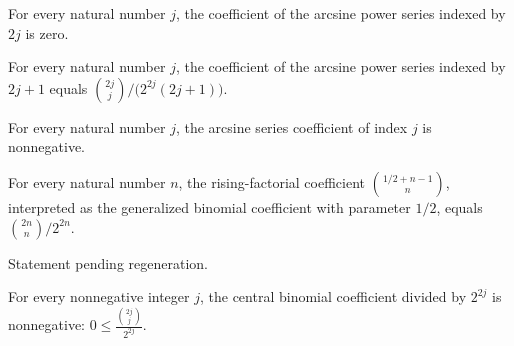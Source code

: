 \begin{lemma}
\label{FABL.arcsinOddPowerCoefficient_mul_two}
\leanok
{}
For every natural number $j$, the coefficient of the arcsine power series indexed by
$2j$ is zero.
\end{lemma}

\begin{lemma}
\label{FABL.arcsinOddPowerCoefficient_mul_two_add_one}
\leanok
{}
For every natural number $j$, the coefficient of the arcsine power series indexed by
$2j+1$ equals $\binom{2j}{j}/\bigl(2^{2j}(2j+1)\bigr)$.
\end{lemma}

\begin{lemma}
\label{FABL.arcsinSeriesCoefficient_nonneg}
\leanok
{}
For every natural number $j$, the arcsine series coefficient of index $j$ is
nonnegative.
\end{lemma}

\begin{lemma}
\label{FABL.multichoose_one_half_eq_centralBinom}
\leanok
{}
For every natural number $n$, the rising-factorial coefficient $\binom{1/2+n-1}{n}$,
interpreted as the generalized binomial coefficient with parameter $1/2$, equals
$\binom{2n}{n}/2^{2n}$.
\end{lemma}

\begin{theorem}[Exercise5 18a]
\label{FABL.exercise5_18a}
\leanok
{}
Statement pending regeneration.
\end{theorem}

\begin{lemma}
\label{FABL.centralBinomialRatio_nonneg}
\leanok
{}
For every nonnegative integer $j$, the central binomial coefficient divided by $2^{2j}$
is nonnegative: $\displaystyle 0 \le \frac{\binom{2j}{j}}{2^{2j}}$.
\end{lemma}

